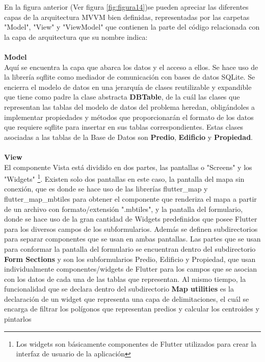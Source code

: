 En la figura anterior (Ver figura \ref{fig:figura14})se pueden apreciar las diferentes capas de la arquitectura MVVM bien definidas,
representadas por las carpetas "Model", "View" y "ViewModel" que contienen la parte del código relacionada con la capa de arquitectura
que su nombre indica:\\\\
\textbf{Model}\\
Aquí se encuentra la capa que abarca los datos y el acceso a ellos. Se hace uso de la librería sqflite \cite{sqflite} como mediador de comunicación
con bases de datos SQLite. Se encierra el modelo de datos en una jerarquía de clases reutilizable y expandible que tiene como padre la clase abstracta \textbf{DBTable},
de la cuál las clases que representan las tablas del modelo de datos del problema heredan, obligándoles a implementar propiedades y métodos que proporcionarán
el formato de los datos que requiere sqflite para insertar en sus tablas correspondientes. Estas clases asociadas a las tablas de la Base de Datos
son \textbf{Predio}, \textbf{Edificio} y \textbf{Propiedad}.
\\\\
\textbf{View}\\
El componente Vista está dividido en dos partes, las pantallas o "Screens" y los "Widgets"
\footnote{Los widgets son básicamente componentes de Flutter utilizados para crear la interfaz de usuario de
    la aplicación}.
Existen solo dos pantallas en este caso, la pantalla del mapa sin conexión, que es donde se hace uso de las librerías flutter\_map y flutter\_map\_mbtiles para
obtener el componente que renderiza el mapa a partir de un archivo con formato/extensión ".mbtiles", y la pantalla del formulario, donde se hace uso de la gran
cantidad de Widgets predefinidos que posee Flutter para los diversos campos de los subformularios. Además se definen subdirectorios para separar componentes que se
usan en ambas pantallas. Las partes que se usan para conformar la pantalla del formulario se encuentran dentro del subdirectorio \textbf{Form Sections} y son los
subformularios Predio, Edificio y Propiedad, que usan individualmente componentes/widgets de Flutter para los campos que se asocian con los datos de cada una de
las tablas que representan. Al mismo tiempo, la funcionalidad que se declara dentro del subdirectorio \textbf{Map utilities} es la declaración de un widget
que representa una capa de delimitaciones, el cuál se encarga de filtrar los polígonos que representan predios y calcular los centroides y pintarlos\\

